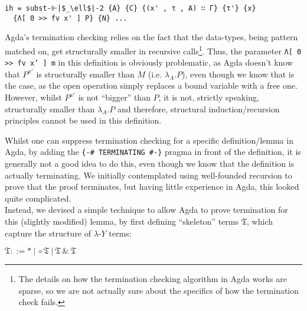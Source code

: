 \documentclass[a4paper, 12pt, twoside]{style/ociamthesis}
\theoremstyle{plain}
\theoremstyle{definition}
\newtheorem{Definition}{Definition}[chapter]
\theoremstyle{remark}
\newcommand{\lamy}{\lambda\text{-}Y}
\newcommand{\amp}{\text{\&}}
\renewenvironment{Definition}{\begin{OldDefinition}\begin{mdframed}[style=example, linecolor=cyan]}{\end{mdframed}\end{OldDefinition}}
\begin{document}
\begin{verbatim}
ih = subst-⊩|$_\ell$|-2 {A} {C} {(x' , τ , A) ∷ Γ} {τ'} {x} 
  {Λ[ 0 >> fv x' ] P} {N} ...
\end{verbatim}

Agda's termination checking relies on the fact that the data-types,
being pattern matched on, get structurally smaller in recursive
calls\footnote{The details on how the termination checking algorithm in
  Agda works are sparse, so we are not actually sure about the specifics
  of how the termination check fails.}. Thus, the parameter
\texttt{Λ[ 0 >> fv x' ] m} in this definition is obviously problematic,
as Agda doesn't know that \(P^{x'}\) is structurally smaller than \(M\)
(i.e. \(\lambda_A. P\)), even though we know that is the case, as the
open operation simply replaces a bound variable with a free one.
However, whilst \(P^{x'}\) is not ``bigger'' than \(P\), it is not,
strictly speaking, structurally smaller than \(\lambda_A.P\) and
therefore, structural induction/recursion principles cannot be used in
this definition.

Whilst one can suppress termination checking for a specific
definition/lemma in Agda, by adding the \texttt{\{-\# TERMINATING \#-\}}
pragma in front of the definition, it is generally not a good idea to do
this, even though we know that the definition is actually terminating.
We initially contemplated using well-founded recursion to prove that the
proof terminates, but having little experience in Agda, this looked
quite complicated.\\
Instead, we devised a simple technique to allow Agda to prove
termination for this (slightly modified) lemma, by first defining
``skeleton'' terms \(\mathfrak{T}\), which capture the structure of
\(\lamy\) terms:\\

\begin{Definition}

\(\mathfrak{T} ::= *\ |\ \circ \mathfrak{T}\ |\ \mathfrak{T}\ \amp\ \mathfrak{T}\)

\end{Definition}
\end{document}
